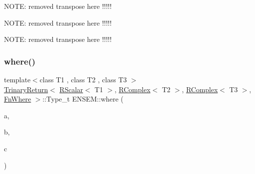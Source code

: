 N\+O\+TE\+: removed transpose here !!!!!

N\+O\+TE\+: removed transpose here !!!!!

N\+O\+TE\+: removed transpose here !!!!! \mbox{\label{group__rcomplex_ga1cdf9105d38ae9d995cba5874914982d}} 
\subsubsection{\texorpdfstring{where()}{where()}\hspace{0.1cm}{\footnotesize\ttfamily [1/3]}}
{\footnotesize\ttfamily template$<$class T1 , class T2 , class T3 $>$ \\
\mbox{\hyperlink{structENSEM_1_1TrinaryReturn}{Trinary\+Return}}$<$ \mbox{\hyperlink{classENSEM_1_1RScalar}{R\+Scalar}}$<$ T1 $>$, \mbox{\hyperlink{classENSEM_1_1RComplex}{R\+Complex}}$<$ T2 $>$, \mbox{\hyperlink{classENSEM_1_1RComplex}{R\+Complex}}$<$ T3 $>$, \mbox{\hyperlink{structENSEM_1_1FnWhere}{Fn\+Where}} $>$\+::Type\+\_\+t E\+N\+S\+E\+M\+::where (\begin{DoxyParamCaption}\item[{const \mbox{\hyperlink{classENSEM_1_1RScalar}{R\+Scalar}}$<$ T1 $>$ \&}]{a,  }\item[{const \mbox{\hyperlink{classENSEM_1_1RComplex}{R\+Complex}}$<$ T2 $>$ \&}]{b,  }\item[{const \mbox{\hyperlink{classENSEM_1_1RComplex}{R\+Complex}}$<$ T3 $>$ \&}]{c }\end{DoxyParamCaption})\hspace{0.3cm}{\ttfamily [inline]}}

\mbox{\label{group__rcomplex_gadf07511990ea74c6e0d3b72f19e880f3}} 

